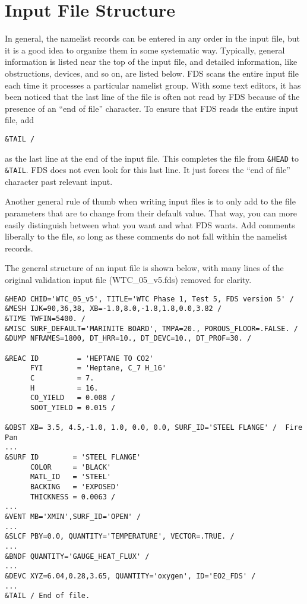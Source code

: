 \documentclass[11pt]{book}
\newcommand{\ct}{\tt\small}
\begin{document}
\section{Input File Structure}

In general, the namelist records can be entered in any order in the input file, but it is a good idea to organize them
in some systematic way. Typically, general information is listed near the top of the input file, and detailed information, like
obstructions, devices, and so on, are listed below. FDS scans the entire input file each time it processes a particular namelist group.
With some text editors, it has been noticed that the last line of the file is often not read by FDS because of the presence of an
``end of file'' character.
To ensure that FDS reads the entire input file, add 

\footnotesize
\begin{verbatim}
&TAIL /
\end{verbatim}
\normalsize \noindent
as the last line at the end of the input file. This completes the file from {\ct \&HEAD} to {\ct \&TAIL}. FDS does not even look for
this last line. It just forces the ``end of file'' character past relevant input.

Another general rule of thumb when writing input files is to only add to the file parameters that are to change from their
default value. That way, you can more easily distinguish between what you want and what FDS wants. Add comments liberally to the file, so long as
these comments do not fall within the namelist records.

The general structure of an input file is shown below, with many
lines of the original validation input file (WTC\_05\_v5.fds) removed for clarity.

\footnotesize
\begin{verbatim}
&HEAD CHID='WTC_05_v5', TITLE='WTC Phase 1, Test 5, FDS version 5' /
&MESH IJK=90,36,38, XB=-1.0,8.0,-1.8,1.8,0.0,3.82 /
&TIME TWFIN=5400. /
&MISC SURF_DEFAULT='MARINITE BOARD', TMPA=20., POROUS_FLOOR=.FALSE. /
&DUMP NFRAMES=1800, DT_HRR=10., DT_DEVC=10., DT_PROF=30. /

&REAC ID         = 'HEPTANE TO CO2'
      FYI        = 'Heptane, C_7 H_16'
      C          = 7.
      H          = 16.
      CO_YIELD   = 0.008 /
      SOOT_YIELD = 0.015 /

&OBST XB= 3.5, 4.5,-1.0, 1.0, 0.0, 0.0, SURF_ID='STEEL FLANGE' /  Fire Pan
...
&SURF ID        = 'STEEL FLANGE'
      COLOR     = 'BLACK'
      MATL_ID   = 'STEEL'
      BACKING   = 'EXPOSED'
      THICKNESS = 0.0063 /
...
&VENT MB='XMIN',SURF_ID='OPEN' /
...
&SLCF PBY=0.0, QUANTITY='TEMPERATURE', VECTOR=.TRUE. /
...
&BNDF QUANTITY='GAUGE_HEAT_FLUX' /
...
&DEVC XYZ=6.04,0.28,3.65, QUANTITY='oxygen', ID='EO2_FDS' /
...
&TAIL / End of file.
\end{verbatim}
\normalsize
\end{document}
